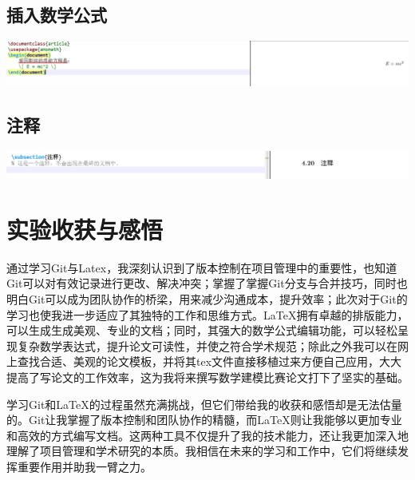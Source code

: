 \documentclass[UTF8,a4paper]{ctexart}
\begin{document}
\begin{sloppypar}
	\subsection{插入数学公式}
	
	\includegraphics[width = 16cm]{29}	
	
	\subsection{注释}
	\includegraphics[width = 16cm]{30}	
	
	\section{实验收获与感悟}
	通过学习Git与Latex，我深刻认识到了版本控制在项目管理中的重要性，也知道Git可以对有效记录进行更改、解决冲突；掌握了掌握Git分支与合并技巧，同时也明白Git可以成为团队协作的桥梁，用来减少沟通成本，提升效率；此次对于Git的学习也使我进一步适应了其独特的工作和思维方式。LaTeX拥有卓越的排版能力，可以生成生成美观、专业的文档；同时，其强大的数学公式编辑功能，可以轻松呈现复杂数学表达式，提升论文可读性，并使之符合学术规范；除此之外我可以在网上查找合适、美观的论文模板，并将其tex文件直接移植过来方便自己应用，大大提高了写论文的工作效率，这为我将来撰写数学建模比赛论文打下了坚实的基础。
	
	学习Git和LaTeX的过程虽然充满挑战，但它们带给我的收获和感悟却是无法估量的。Git让我掌握了版本控制和团队协作的精髓，而LaTeX则让我能够以更加专业和高效的方式编写文档。这两种工具不仅提升了我的技术能力，还让我更加深入地理解了项目管理和学术研究的本质。我相信在未来的学习和工作中，它们将继续发挥重要作用并助我一臂之力。
	
\end{sloppypar}
\end{document}
